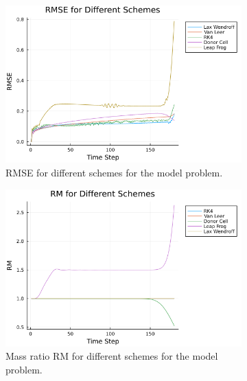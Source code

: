 \begin{figure}[h]
    \centering

    \begin{subfigure}[b]{0.3\textwidth}
        \includegraphics[width=\textwidth]{./images/rectangle-RMSE.png}
        \caption{RMSE for different schemes for the model problem.}
        \label{fig:rmse}
    \end{subfigure}
    \hfill
    \begin{subfigure}[b]{0.3\textwidth}
        \includegraphics[width=\textwidth]{./images/rectangle-RM.png}
        \caption{Mass ratio $\mathrm{RM}$ for different schemes for the model problem.}
        \label{fig:rm}
    \end{subfigure}
    \hfill
    \begin{subfigure}[b]{0.3\textwidth}

\end{subfigure}
\end{figure}
